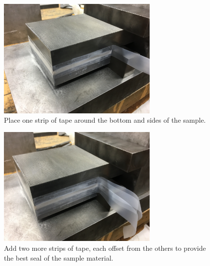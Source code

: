 \begin{figure}
	\centering
        \includegraphics[width=0.7\textwidth]{appendix_sample_prep/dds_one_strip_tape.jpg}
   	\caption{Place one strip of tape around the bottom and sides of the sample.}
  	\label{Fig:dds_one_strip_tape}
\end{figure}

\clearpage

\begin{figure}
	\centering
        \includegraphics[width=0.7\textwidth]{appendix_sample_prep/dds_three_strip_tape.jpg}
   	\caption{Add two more strips of tape, each offset from the others to provide the best seal of the sample material.}
  	\label{Fig:dds_three_strip_tape}
\end{figure}


